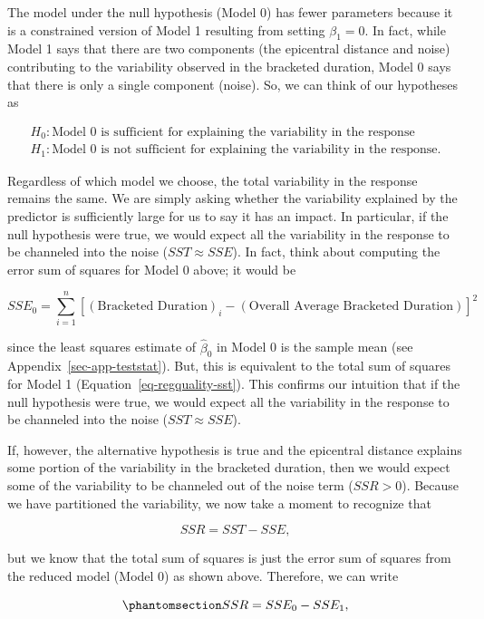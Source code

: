 \documentclass[
  letterpaper,
  DIV=11,
  numbers=noendperiod]{scrreprt}
\theoremstyle{plain}
\theoremstyle{definition}
\theoremstyle{definition}
\theoremstyle{remark}
\begin{document}
The model under the null hypothesis (Model 0) has fewer parameters
because it is a constrained version of Model 1 resulting from setting
\(\beta_1 = 0\). In fact, while Model 1 says that there are two
components (the epicentral distance and noise) contributing to the
variability observed in the bracketed duration, Model 0 says that there
is only a single component (noise). So, we can think of our hypotheses
as

\[
\begin{aligned}
  H_0: \text{Model 0 is sufficient for explaining the variability in the response} \\
  H_1: \text{Model 0 is not sufficient for explaining the variability in the response.}
\end{aligned}
\]

Regardless of which model we choose, the total variability in the
response remains the same. We are simply asking whether the variability
explained by the predictor is sufficiently large for us to say it has an
impact. In particular, if the null hypothesis were true, we would expect
all the variability in the response to be channeled into the noise
(\(SST \approx SSE\)). In fact, think about computing the error sum of
squares for Model 0 above; it would be

\[SSE_0 = \sum_{i=1}^{n} \left[(\text{Bracketed Duration})_i - (\text{Overall Average Bracketed Duration})\right]^2\]

since the least squares estimate of \(\widehat{\beta}_0\) in Model 0 is
the sample mean (see Appendix~\ref{sec-app-teststat}). But, this is
equivalent to the total sum of squares for Model 1
(Equation~\ref{eq-regquality-sst}). This confirms our intuition that if
the null hypothesis were true, we would expect all the variability in
the response to be channeled into the noise (\(SST \approx SSE\)).

If, however, the alternative hypothesis is true and the epicentral
distance explains some portion of the variability in the bracketed
duration, then we would expect some of the variability to be channeled
out of the noise term (\(SSR > 0\)). Because we have partitioned the
variability, we now take a moment to recognize that

\[SSR = SST - SSE,\]

but we know that the total sum of squares is just the error sum of
squares from the reduced model (Model 0) as shown above. Therefore, we
can write

\begin{equation}\phantomsection\label{eq-regquality-ssr-difference}{SSR = SSE_0 - SSE_1,}\end{equation}
\end{document}
